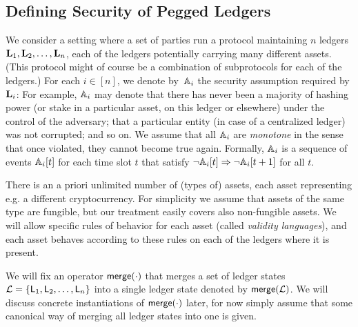 \subsection{Defining Security of Pegged Ledgers}
\label{sec:definition}


We consider a setting where a set of parties run a protocol maintaining $n$
ledgers $\Ledger_1,\Ledger_2,\allowbreak \ldots,\allowbreak \Ledger_n$, each of the ledgers potentially
carrying many different assets. (This protocol might of course be a combination
of subprotocols for each of the ledgers.)
For each $i\in[n]$, we denote by~$\Assum_i$ the security assumption
required by $\Ledger_i$: For example, $\Assum_i$ may denote that
there has never been a majority of hashing power (or stake in a particular
asset, on this ledger or elsewhere) under the control of the adversary; that a
particular entity (in case of a centralized ledger) was not corrupted; and so
on.  We assume that all $\Assum_i$ are \emph{monotone} in the sense that once
violated, they cannot become true again. Formally, $\Assum_i$ is a
sequence of events $\Assum_i[t]$ for each time slot $t$ that satisfy
$\lnot\Assum_i[t] \Rightarrow \lnot\Assum_i[t+1]$ for all $t$.

There is an a priori unlimited number of (types of) assets, each asset
representing e.g. a different cryptocurrency.
For simplicity we assume that assets of the same type
are fungible, but our treatment easily covers also non-fungible assets.
We will allow specific rules of behavior for each asset (called \emph{validity
languages}), and each asset behaves
according to these rules on each of the ledgers where it is present.

We will fix an operator $\merge(\cdot)$ that
 merges a set of ledger states
$\mathcal{L}=\{\LState_1,\allowbreak \LState_2,\allowbreak \ldots,\allowbreak \LState_n\}$ into a single ledger
state  denoted by $\merge(\mathcal{L})$. We will discuss concrete instantiations
of $\merge(\cdot)$ later, for now simply assume that some canonical way of
merging all ledger states into one is given.

